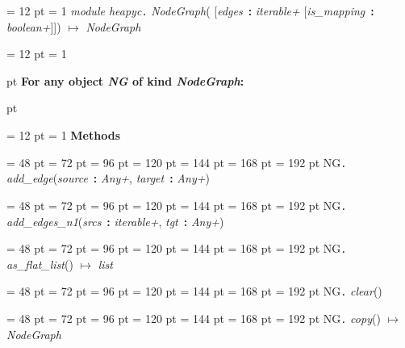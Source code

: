 {{{{{{\par \pagebreak[3.100000] \noindent \hangindent = 12 pt \hangafter = 1 
 {\em module heapyc\/}{\large {\tt .\/} {\em NodeGraph\/}}( {[}{\em edges\/}~{\bf :}  {\em iterable+\/}  {[}{\em is{\_}mapping\/}~{\bf :}  {\em boolean+\/}]]) \(\mapsto \)  {\em NodeGraph\/}\par}
\par}
\par}
{\par \pagebreak[3.200000] \noindent \hangindent = 12 pt \hangafter = 1 
{\par \pagebreak[2]  pt \noindent
{\large {\bf For any object {\em NG\/} of kind  {\em NodeGraph\/}:\/}}\par {} pt
} \noindent
\par}
{\par \pagebreak[3.200000] \noindent \hangindent = 12 pt \hangafter = 1 
{\bf {\large {\bf Methods\/}}\/}\par}
{\par \noindent  \leftskip = 48 pt  \leftmargini = 72 pt  \leftmarginii = 96 pt  \leftmarginiii = 120 pt  \leftmarginiv = 144 pt  \leftmarginv = 168 pt  \leftmarginvi = 192 pt NG{\large {\tt .\/} {\em add{\_}edge\/}}({\em source\/}~{\bf :}  {\em Any+\/}, {\em target\/}~{\bf :}  {\em Any+\/})\par}
{\par \noindent  \leftskip = 48 pt  \leftmargini = 72 pt  \leftmarginii = 96 pt  \leftmarginiii = 120 pt  \leftmarginiv = 144 pt  \leftmarginv = 168 pt  \leftmarginvi = 192 pt NG{\large {\tt .\/} {\em add{\_}edges{\_}n1\/}}({\em srcs\/}~{\bf :}  {\em iterable+\/}, {\em tgt\/}~{\bf :}  {\em Any+\/})\par}
{\par \noindent  \leftskip = 48 pt  \leftmargini = 72 pt  \leftmarginii = 96 pt  \leftmarginiii = 120 pt  \leftmarginiv = 144 pt  \leftmarginv = 168 pt  \leftmarginvi = 192 pt NG{\large {\tt .\/} {\em as{\_}flat{\_}list\/}}() \(\mapsto \)  {\em list\/}\par}
{\par \noindent  \leftskip = 48 pt  \leftmargini = 72 pt  \leftmarginii = 96 pt  \leftmarginiii = 120 pt  \leftmarginiv = 144 pt  \leftmarginv = 168 pt  \leftmarginvi = 192 pt NG{\large {\tt .\/} {\em clear\/}}()\par}
{\par \noindent  \leftskip = 48 pt  \leftmargini = 72 pt  \leftmarginii = 96 pt  \leftmarginiii = 120 pt  \leftmarginiv = 144 pt  \leftmarginv = 168 pt  \leftmarginvi = 192 pt NG{\large {\tt .\/} {\em copy\/}}() \(\mapsto \)  {\em NodeGraph\/}\par}
}}}

